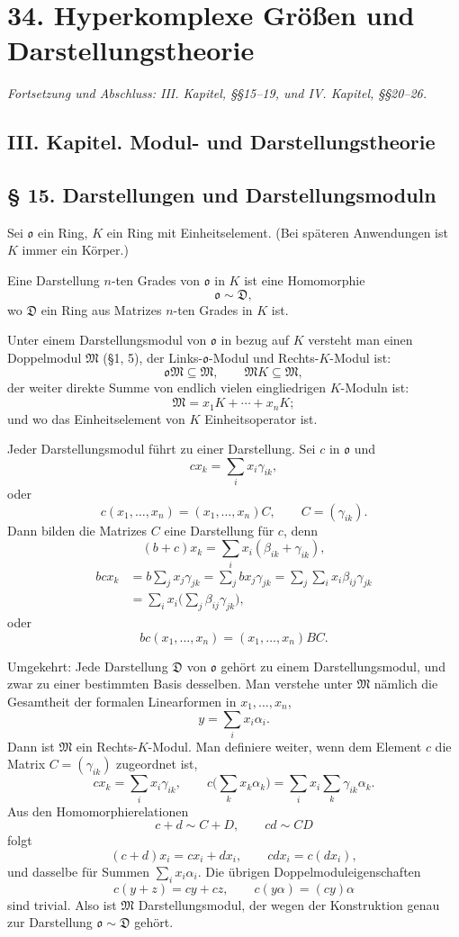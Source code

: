 \documentclass[11pt]{article}
\providecommand{\mM}{\mathfrak{M}}
\providecommand{\mo}{\mathfrak{o}}
\begin{document}
\section*{34. Hyperkomplexe Größen und Darstellungstheorie}
\emph{Fortsetzung und Abschluss: III. Kapitel, §§15--19, und IV. Kapitel, §§20--26.}

\subsection*{III. Kapitel. Modul- und Darstellungstheorie}

\subsection*{§ 15. Darstellungen und Darstellungsmoduln}
Sei $\mo$ ein Ring, $K$ ein Ring mit Einheitselement. (Bei späteren Anwendungen ist $K$ immer ein Körper.)

Eine Darstellung $n$-ten Grades von $\mo$ in $K$ ist eine Homomorphie
\[
        \mo\sim\mathfrak D,
\]
wo $\mathfrak D$ ein Ring aus Matrizes $n$-ten Grades in $K$ ist.

Unter einem Darstellungsmodul von $\mo$ in bezug auf $K$ versteht man einen Doppelmodul $\mM$ (§1, 5), der Links-$\mo$-Modul und Rechts-$K$-Modul ist:
\[
        \mo\mM\subseteq\mM,
        \qquad
        \mM K\subseteq\mM,
\]
der weiter direkte Summe von endlich vielen eingliedrigen $K$-Moduln ist:
\[
        \mM=x_1K+\cdots+x_nK;
\]
und wo das Einheitselement von $K$ Einheitsoperator ist.

Jeder Darstellungsmodul führt zu einer Darstellung. Sei $c$ in $\mo$ und
\[
        cx_k=\sum_i x_i\gamma_{ik},
\]
oder
\[
        c(x_1,\ldots,x_n)=(x_1,\ldots,x_n)C,
        \qquad C=(\gamma_{ik}).
\]
Dann bilden die Matrizes $C$ eine Darstellung für $c$, denn
\[
        (b+c)x_k=\sum_i x_i(\beta_{ik}+\gamma_{ik}),
\]
\[
\begin{aligned}
        bcx_k
        &=b\sum_jx_j\gamma_{jk}
          =\sum_j b x_j\gamma_{jk}
          =\sum_j\sum_i x_i\beta_{ij}\gamma_{jk}  \\
        &=\sum_i x_i\biggl(\sum_j\beta_{ij}\gamma_{jk}\biggr),
\end{aligned}
\]
oder
\[
        bc(x_1,\ldots,x_n)=(x_1,\ldots,x_n)BC.
\]

Umgekehrt: Jede Darstellung $\mathfrak D$ von $\mo$ gehört zu einem Darstellungsmodul, und zwar zu einer bestimmten Basis desselben. Man verstehe unter $\mM$ nämlich die Gesamtheit der formalen Linearformen in $x_1,\ldots,x_n$,
\[
        y=\sum_i x_i\alpha_i.
\]
Dann ist $\mM$ ein Rechts-$K$-Modul. Man definiere weiter, wenn dem Element $c$ die Matrix $C=(\gamma_{ik})$ zugeordnet ist,
\[
        cx_k=\sum_i x_i\gamma_{ik},
        \qquad
        c\biggl(\sum_k x_k\alpha_k\biggr)=\sum_i x_i\sum_k\gamma_{ik}\alpha_k.
\]
Aus den Homomorphierelationen
\[
        c+d\sim C+D,
        \qquad cd\sim CD
\]
folgt
\[
        (c+d)x_i=cx_i+dx_i,
        \qquad cdx_i=c(dx_i),
\]
und dasselbe für Summen $\sum_i x_i\alpha_i$. Die übrigen Doppelmoduleigenschaften
\[
        c(y+z)=cy+cz,
        \qquad c(y\alpha)=(cy)\alpha
\]
sind trivial. Also ist $\mM$ Darstellungsmodul, der wegen der Konstruktion genau zur Darstellung $\mo\sim\mathfrak D$ gehört.
\end{document}
